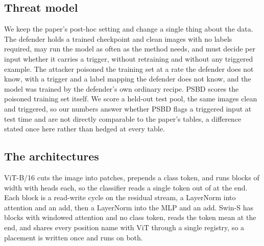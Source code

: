 \documentclass[../main.tex]{subfiles}
\begin{document}
\subsection{Threat model}

We keep the paper's post-hoc setting and change a single thing about the data. The defender holds a trained checkpoint and \HeldoutSize{} clean images with no labels required, may run the model as often as the method needs, and must decide per input whether it carries a trigger, without retraining and without any triggered example. The attacker poisoned the training set at a rate the defender does not know, with a trigger and a label mapping the defender does not know, and the model was trained by the defender's own ordinary recipe. PSBD scores the poisoned training set itself. We score a held-out test pool, the same images clean and triggered, so our numbers answer whether PSBD flags a triggered input at test time and are not directly comparable to the paper's tables, a difference stated once here rather than hedged at every table.

\subsection{The architectures}

ViT-B/16 \citep{dosovitskiy2021an} cuts the image into \VitPatches{} patches, prepends a class token, and runs \VitBlocks{} blocks of width \VitWidth{} with \VitHeads{} heads each, so the classifier reads a single token out of \VitTokens{} at the end. Each block is a read-write cycle on the residual stream, a LayerNorm into attention and an add, then a LayerNorm into the MLP and an add. Swin-S \citep{liu2021swin} has \SwinBlocks{} blocks with windowed attention and no class token, reads the token mean at the end, and shares every position name with ViT through a single registry, so a placement is written once and runs on both.
\end{document}
